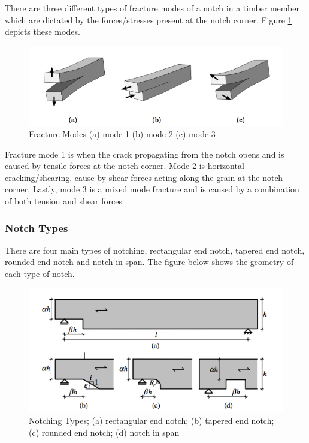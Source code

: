 \documentclass[11pt,a4paper]{article}
\numberwithin{equation}{subsection}
\begin{document}
	\pagebreak
	
	\noindent
	There are three different types of fracture modes of a notch in a timber member which are dictated by the forces/stresses present at the notch corner. Figure \ref{fig:Frac_Mode} depicts these modes.

	       	\begin{figure}[h]
	       		\includegraphics[scale=0.53]{Fracture_Modes}
	       		\caption{Fracture Modes (a) mode 1  (b) mode 2  (c) mode 3 \cite{jockwer_structural_2014}}
	       		\label{fig:Frac_Mode}
	       	\end{figure}
	
	\noindent
	Fracture mode 1 is when the crack propagating from the notch opens and is caused by tensile forces at the notch corner. Mode 2 is horizontal cracking/shearing, cause by shear forces acting along the grain at the notch corner. Lastly, mode 3 is a mixed mode fracture and is caused by a combination of both tension and shear forces \cite{jockwer_structural_2014}. 
	
	\subsubsection{Notch Types}
	There are four main types of notching, rectangular end notch, tapered end notch, rounded end notch and notch in span. The figure below shows the geometry of each type of notch.
	
	\begin{center}
		\begin{figure}[h]
			\includegraphics[scale=0.9]{Notch_Types}
			\caption{Notching Types; (a) rectangular end notch; (b) tapered end notch; (c) rounded end notch; (d) notch in span \cite{jockwer_state---art_2013}}
		\end{figure}
	\end{center}
	
\end{document}
